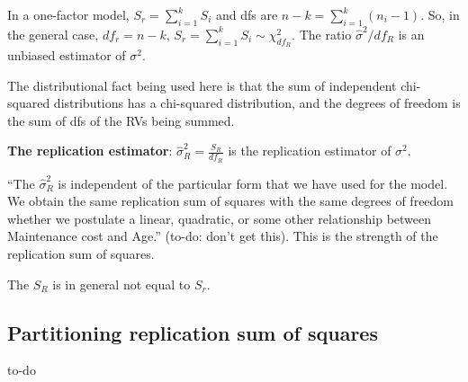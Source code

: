 In a one-factor model, $S_r = \sum_{i=1}^k S_i$ and dfs are $n-k = \sum_{i=1}^k (n_i -1)$. 
So, in the general case,  $df_r=n-k$,  $S_r = \sum_{i=1}^k S_i\sim \chi_{df_R}^2$. The ratio $\hat{\sigma}^2/df_R$ is an unbiased estimator of $\sigma^2$.

The distributional fact being used here is that the sum of independent chi-squared distributions has a chi-squared distribution, and the degrees of freedom is the sum of dfs of the RVs being summed.

\textbf{The replication estimator}: $\hat{\sigma}_R^2=\frac{S_R}{df_R}$ is the replication estimator of $\sigma^2$.

``The $\hat{\sigma}_R^2$ is independent of the particular form that we have used for the model. We obtain the same replication sum of squares with the same degrees of freedom whether we postulate a linear, quadratic, or some other relationship between Maintenance cost and Age.'' (to-do: don't get this). This is the strength of the replication sum of squares.

The $S_R$ is in general not equal to $S_r$.

\subsection{Partitioning replication sum of squares}

to-do



